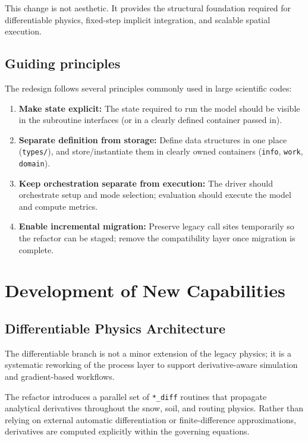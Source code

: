 \documentclass[11pt]{scrartcl}
\begin{document}
This change is not aesthetic. It provides the structural foundation required
for differentiable physics, fixed-step implicit integration, and scalable
spatial execution.

\subsection{Guiding principles}

The redesign follows several principles commonly used in large scientific codes:

\begin{enumerate}[leftmargin=*]
\item \textbf{Make state explicit:} The state required to run the model should be visible
      in the subroutine interfaces (or in a clearly defined container passed in).
\item \textbf{Separate definition from storage:} Define data structures in one place
      (\texttt{types/}), and store/instantiate them in clearly owned containers
      (\texttt{info}, \texttt{work}, \texttt{domain}).
\item \textbf{Keep orchestration separate from execution:} The driver should orchestrate
      setup and mode selection; evaluation should execute the model and compute metrics.
\item \textbf{Enable incremental migration:} Preserve legacy call sites temporarily so
      the refactor can be staged; remove the compatibility layer once migration is complete.
\end{enumerate}

\section{Development of New Capabilities}

\subsection{Differentiable Physics Architecture}

The differentiable branch is not a minor extension of the legacy physics;
it is a systematic reworking of the process layer to support derivative-aware
simulation and gradient-based workflows.

The refactor introduces a parallel set of \texttt{*\_diff} routines that
propagate analytical derivatives throughout the snow, soil, and routing
physics. Rather than relying on external automatic differentiation or
finite-difference approximations, derivatives are computed explicitly
within the governing equations.
\end{document}
